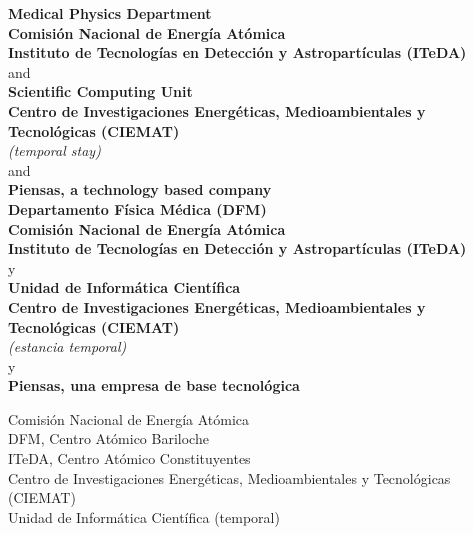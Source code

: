 \begin{center}
	\ifeng
		{\textbf{Medical Physics Department}}\\
		{\textbf{Comisión Nacional de Energía Atómica}}\\
		{\textbf{Instituto de Tecnologías en Detección y Astropartículas (ITeDA)}}\\
		and \\
		{\textbf{Scientific Computing Unit}}\\
		{\textbf{Centro de Investigaciones Energéticas, Medioambientales y Tecnológicas (CIEMAT)}}\\
		{\textit{(temporal stay)}}\\
		\ifpien
			and \\
			{\textbf{Piensas, a technology based company}}\\
		\fi
	\else
		{\textbf{Departamento Física Médica (DFM)}}\\
		{\textbf{Comisión Nacional de Energía Atómica}}\\
		{\textbf{Instituto de Tecnologías en Detección y Astropartículas (ITeDA)}}\\
		y \\
		{\textbf{Unidad de Informática Científica}}\\
		{\textbf{Centro de Investigaciones Energéticas, Medioambientales y Tecnológicas (CIEMAT)}}\\
		{\textit{(estancia temporal)}}\\
		\ifpien
			y \\
			{\textbf{Piensas, una empresa de base tecnológica}}\\
		\fi
	\fi
	\vspace{1cm}
\end{center}
\begin{minipage}[t]{0.60\textwidth}
	Comisión Nacional de Energía Atómica\\
	\hspace*{1em}DFM, Centro Atómico Bariloche\\
	\hspace*{1em}ITeDA, Centro Atómico Constituyentes\\
	Centro de Investigaciones Energéticas, Medioambientales y Tecnológicas (CIEMAT)\\
	\hspace*{1em}Unidad de Informática Científica (temporal)\\
\end{minipage}\hspace*{0.02\textwidth}

